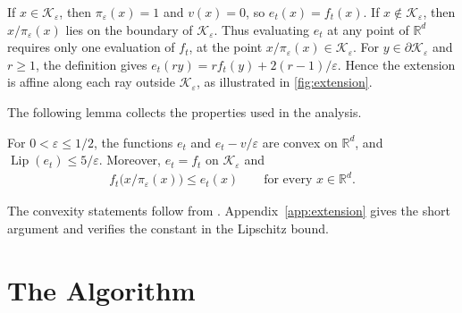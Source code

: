 \documentclass[12pt,cleveref]{jmlr}
\newcommand{\R}{\mathbb R}
\newcommand{\K}{\mathcal K}
\newcommand{\Lip}{\operatorname{Lip}}
\newcommand{\1}{\mathbf 1}
\newcommand{\eps}{\varepsilon}
\begin{document}
If $x\in\K_\eps$, then $\pi_\eps(x)=1$ and $v(x)=0$, so $e_t(x)=f_t(x)$.
If $x\notin\K_\eps$, then $x/\pi_\eps(x)$ lies on the boundary of
$\K_\eps$. Thus evaluating $e_t$ at any point of $\R^d$ requires only one
evaluation of $f_t$, at the point $x/\pi_\eps(x)\in\K_\eps$.
For $y\in\partial\K_\eps$ and $r\geq1$, the definition gives
$e_t(ry)=rf_t(y)+2(r-1)/\eps$. Hence the extension is affine along each
ray outside $\K_\eps$, as illustrated in \cref{fig:extension}.

The following lemma collects the properties used in the analysis.
\begin{lemma}\label{lem:extension}
    For $0<\eps\leq1/2$, the functions $e_t$ and $e_t-v/\eps$ are convex on
    $\R^d$, and $\Lip(e_t)\leq5/\eps$. Moreover, $e_t=f_t$ on $\K_\eps$ and
    \begin{align}
        f_t\bigl(x/\pi_\eps(x)\bigr)\leq e_t(x)
        \qquad\text{for every }x\in\R^d.
    \end{align}
\end{lemma}
The convexity statements follow from
\citet[Proposition~3.23]{lattimore2026bandit}. Appendix~\ref{app:extension}
gives the short argument and verifies the constant in the Lipschitz bound.

\section{The Algorithm}
\label{sec:algorithm}
\end{document}
